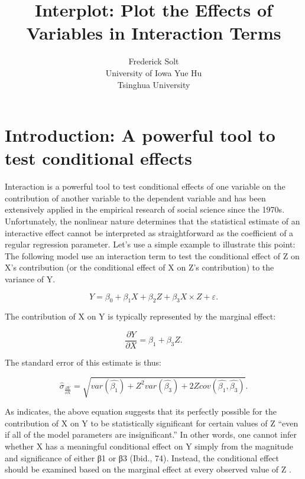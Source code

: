\documentclass[
  article]{jss}
\author{Frederick Solt\\University of Iowa \And Yue Hu\\Tsinghua
University}
\title{Interplot: Plot the Effects of Variables in Interaction Terms}
\begin{document}
\maketitle
\hypertarget{sec-introduction-apowerful-tool-to-test-conditional-effects}{%
\section{Introduction: A powerful tool to test conditional
effects}\label{sec-introduction-apowerful-tool-to-test-conditional-effects}}

Interaction is a powerful tool to test conditional effects of one
variable on the contribution of another variable to the dependent
variable and has been extensively applied in the empirical research of
social science since the 1970s\citep{Wright1976}. Unfortunately, the
nonlinear nature determines that the statistical estimate of an
interactive effect cannot be interpreted as straightforward as the
coefficient of a regular regression parameter. Let's use a simple
example to illustrate this point: The following model use an interaction
term to test the conditional effect of Z on X's contribution (or the
conditional effect of X on Z's contribution) to the variance of Y.

\[
Y = \beta_0 + \beta_1X + \beta_2Z + \beta_3X\times Z + \varepsilon.
\]

The contribution of X on Y is typically represented by the marginal
effect:

\[
\frac{\partial Y}{\partial X} = \beta_1 + \beta_3Z.
\]

The standard error of this estimate is thus:

\[
\hat{\sigma}_{\frac{\partial Y}{\partial X}} = \sqrt{var(\hat{\beta_1}) + Z^2var(\hat{\beta_3}) + 2Zcov(\hat{\beta_1}, \hat{\beta_3})}.
\]

As \citet[p.70]{BramborClarkGolder2006} indicates, the above equation
suggests that its perfectly possible for the contribution of X on Y to
be statistically significant for certain values of Z ``even if all of
the model parameters are insignificant.'' In other words, one cannot
infer whether X has a meaningful conditional effect on Y simply from the
magnitude and significance of either β1 or β3 (Ibid., 74). Instead, the
conditional effect should be examined based on the marginal effect at
every observed value of Z
\citep{BerryGolderMilton2012, BramborClarkGolder2006, Braumoeller2004}.
\end{document}
